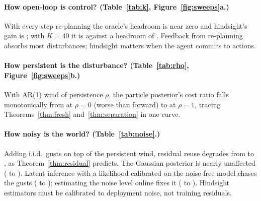 \documentclass[11pt]{article}
\begin{document}
\paragraph{How open-loop is control? (Table~\ref{tab:k}, Figure~\ref{fig:sweeps}a.)} With every-step re-planning the
oracle's headroom is near zero and hindsight's gain is \ksGainOne; with $K=40$ it is \ksGainForty{} against a headroom of
\ksHeadForty. Feedback from re-planning absorbs most disturbances; hindsight matters when the agent commits to actions.
\begin{table}[h]\centering\scriptsize\caption{Gain over forward by chunk length $K$.}\label{tab:k}\end{table}

\paragraph{How persistent is the disturbance? (Table~\ref{tab:rho}, Figure~\ref{fig:sweeps}b.)} With AR(1) wind of
persistence $\rho$, the particle posterior's cost ratio falls monotonically from \rhoZero{} at $\rho=0$ (worse than
forward) to \rhoOne{} at $\rho=1$, tracing Theorems~\ref{thm:fresh} and~\ref{thm:separation} in one curve.
\begin{table}[h]\centering\scriptsize\caption{Cost ratio vs forward by persistence.}\label{tab:rho}\end{table}

\paragraph{How noisy is the world? (Table~\ref{tab:noise}.)} Adding i.i.d.\ gusts on top of the persistent wind,
residual reuse degrades from \nzResidZero{} to \nzResidOne{}, as Theorem~\ref{thm:residual} predicts. The Gaussian
posterior is nearly unaffected (\nzPostZero{} to \nzPostOne). Latent inference with a likelihood calibrated on the
noise-free model chases the gusts (\nzFixedZero{} to \nzFixedOne); estimating the noise level online fixes it
(\nzAdaptZero{} to \nzAdaptOne). Hindsight estimators must be calibrated to deployment noise, not training residuals.
\begin{table}[h]\centering\scriptsize\caption{Cost ratio vs forward under gust noise.}\label{tab:noise}\end{table}
\end{document}
